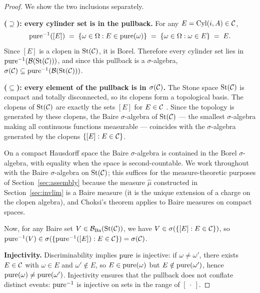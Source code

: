 \begin{proof}
We show the two inclusions separately.

\textbf{($\supseteq$): every cylinder set is in the pullback.}
For any $E = \mathrm{Cyl}(i,A) \in \mathcal{C}$,
\[
  \mathrm{pure}^{-1}([E]) \;=\; \{\omega \in \Omega : E \in \mathrm{pure}(\omega)\}
  \;=\; \{\omega \in \Omega : \omega \in E\} \;=\; E.
\]
Since $[E]$ is a clopen in $\mathrm{St}(\mathcal{C})$, it is Borel.  Therefore every cylinder set
lies in $\mathrm{pure}^{-1}(\mathcal{B}(\mathrm{St}(\mathcal{C})))$, and since this pullback is a
$\sigma$-algebra, $\sigma(\mathcal{C}) \subseteq \mathrm{pure}^{-1}(\mathcal{B}(\mathrm{St}(\mathcal{C})))$.

\textbf{($\subseteq$): every element of the pullback is in $\sigma(\mathcal{C})$.}
The Stone space $\mathrm{St}(\mathcal{C})$ is compact and totally disconnected, so its clopens
form a topological basis.  The clopens of $\mathrm{St}(\mathcal{C})$ are exactly the sets $[E]$
for $E \in \mathcal{C}$ \cite[I.3.2]{johnstone1982}.  Since the topology is generated by
these clopens, the Baire $\sigma$-algebra of $\mathrm{St}(\mathcal{C})$ --- the smallest
$\sigma$-algebra making all continuous functions measurable --- coincides with the
$\sigma$-algebra generated by the clopens $\{[E] : E \in \mathcal{C}\}$.

\begin{remark}
On a compact Hausdorff space the Baire $\sigma$-algebra is contained in the Borel
$\sigma$-algebra, with equality when the space is second-countable.  We work
throughout with the Baire $\sigma$-algebra on $\mathrm{St}(\mathcal{C})$; this suffices for the
measure-theoretic purposes of Section~\ref{sec:assembly} because the measure
$\hat{\mu}$ constructed in Section~\ref{sec:invlim} is a Baire measure (it is
the unique extension of a charge on the clopen algebra), and Choksi's theorem
\cite{choksi1958} applies to Baire measures on compact spaces.
\end{remark}

Now, for any Baire set $V \in \mathcal{B}_{\mathrm{Ba}}(\mathrm{St}(\mathcal{C}))$, we have
$V \in \sigma(\{[E] : E \in \mathcal{C}\})$, so $\mathrm{pure}^{-1}(V) \in
\sigma(\{\mathrm{pure}^{-1}([E]) : E \in \mathcal{C}\}) = \sigma(\mathcal{C})$.

\textbf{Injectivity.}
Discriminability implies $\mathrm{pure}$ is injective: if $\omega \neq \omega'$, there exists
$E \in \mathcal{C}$ with $\omega \in E$ and $\omega' \notin E$, so $E \in \mathrm{pure}(\omega)$
but $E \notin \mathrm{pure}(\omega')$, hence $\mathrm{pure}(\omega) \neq \mathrm{pure}(\omega')$.  Injectivity
ensures that the pullback does not conflate distinct events: $\mathrm{pure}^{-1}$ is
injective on sets in the range of $[\ \cdot\ ]$.
\end{proof}


